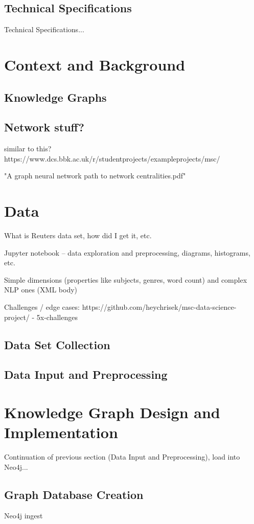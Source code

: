 \documentclass[11pt]{article}
\begin{document}
\subsection{Technical Specifications}
Technical Specifications...

\section{Context and Background}
\subsection{Knowledge Graphs}
\subsection{Network stuff?}
similar to this?
https://www.dcs.bbk.ac.uk/r/studentprojects/exampleprojects/msc/

"A graph neural network path to network centralities.pdf"


\section{Data}

What is Reuters data set, how did I get it, etc.

Jupyter notebook -- data exploration and preprocessing, diagrams, histograms, etc.

Simple dimensions (properties like subjects, genres, word count) and complex NLP ones (XML body)

Challenges / edge cases: https://github.com/heychrisek/msc-data-science-project/ - 5x-challenges

\subsection{Data Set Collection}
\subsection{Data Input and Preprocessing}


\section{Knowledge Graph Design and Implementation}

Continuation of previous section (Data Input and Preprocessing), load into Neo4j...

\subsection{Graph Database Creation}
Neo4j ingest
\end{document}
